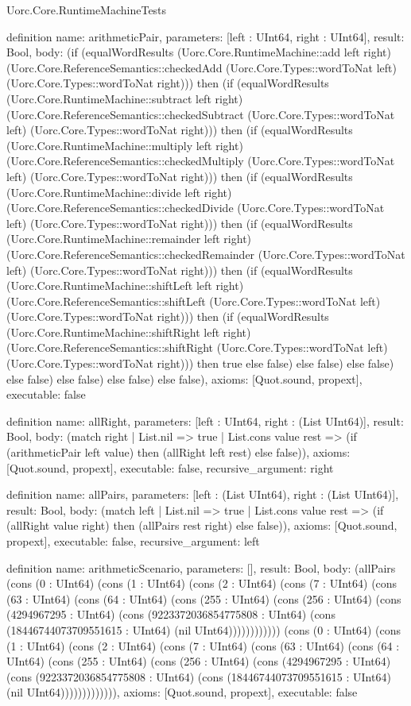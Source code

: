\begin{lexlean}{Uorc.Core.RuntimeMachineTests}
\begin{semanticmodule}
definition{
  name: arithmeticPair,
  parameters: [left : UInt64, right : UInt64],
  result: Bool,
  body: (if (equalWordResults (Uorc.Core.RuntimeMachine::add left right) (Uorc.Core.ReferenceSemantics::checkedAdd (Uorc.Core.Types::wordToNat left) (Uorc.Core.Types::wordToNat right))) then (if (equalWordResults (Uorc.Core.RuntimeMachine::subtract left right) (Uorc.Core.ReferenceSemantics::checkedSubtract (Uorc.Core.Types::wordToNat left) (Uorc.Core.Types::wordToNat right))) then (if (equalWordResults (Uorc.Core.RuntimeMachine::multiply left right) (Uorc.Core.ReferenceSemantics::checkedMultiply (Uorc.Core.Types::wordToNat left) (Uorc.Core.Types::wordToNat right))) then (if (equalWordResults (Uorc.Core.RuntimeMachine::divide left right) (Uorc.Core.ReferenceSemantics::checkedDivide (Uorc.Core.Types::wordToNat left) (Uorc.Core.Types::wordToNat right))) then (if (equalWordResults (Uorc.Core.RuntimeMachine::remainder left right) (Uorc.Core.ReferenceSemantics::checkedRemainder (Uorc.Core.Types::wordToNat left) (Uorc.Core.Types::wordToNat right))) then (if (equalWordResults (Uorc.Core.RuntimeMachine::shiftLeft left right) (Uorc.Core.ReferenceSemantics::shiftLeft (Uorc.Core.Types::wordToNat left) (Uorc.Core.Types::wordToNat right))) then (if (equalWordResults (Uorc.Core.RuntimeMachine::shiftRight left right) (Uorc.Core.ReferenceSemantics::shiftRight (Uorc.Core.Types::wordToNat left) (Uorc.Core.Types::wordToNat right))) then true else false) else false) else false) else false) else false) else false) else false),
  axioms: [Quot.sound, propext],
  executable: false
}

definition{
  name: allRight,
  parameters: [left : UInt64, right : (List UInt64)],
  result: Bool,
  body: (match right
    | List.nil => true
    | List.cons value rest => (if (arithmeticPair left value) then (allRight left rest) else false)),
  axioms: [Quot.sound, propext],
  executable: false,
  recursive_argument: right
}

definition{
  name: allPairs,
  parameters: [left : (List UInt64), right : (List UInt64)],
  result: Bool,
  body: (match left
    | List.nil => true
    | List.cons value rest => (if (allRight value right) then (allPairs rest right) else false)),
  axioms: [Quot.sound, propext],
  executable: false,
  recursive_argument: left
}

definition{
  name: arithmeticScenario,
  parameters: [],
  result: Bool,
  body: (allPairs (cons (0 : UInt64) (cons (1 : UInt64) (cons (2 : UInt64) (cons (7 : UInt64) (cons (63 : UInt64) (cons (64 : UInt64) (cons (255 : UInt64) (cons (256 : UInt64) (cons (4294967295 : UInt64) (cons (9223372036854775808 : UInt64) (cons (18446744073709551615 : UInt64) (nil UInt64)))))))))))) (cons (0 : UInt64) (cons (1 : UInt64) (cons (2 : UInt64) (cons (7 : UInt64) (cons (63 : UInt64) (cons (64 : UInt64) (cons (255 : UInt64) (cons (256 : UInt64) (cons (4294967295 : UInt64) (cons (9223372036854775808 : UInt64) (cons (18446744073709551615 : UInt64) (nil UInt64))))))))))))),
  axioms: [Quot.sound, propext],
  executable: false
}


\end{semanticmodule}
\end{lexlean}
